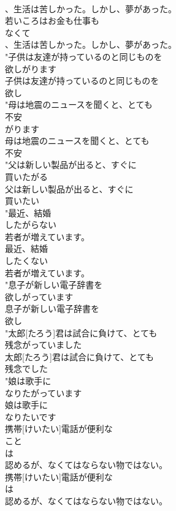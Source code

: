 \documentclass[8pt]{extreport}
\begin{document}
\begin{CJK}{UTF8}{min}
\\	、生活は苦しかった。しかし、夢があった。
\\	若いころはお金も仕事も
\\	なくて
\\	、生活は苦しかった。しかし、夢があった。
\\	"子供は友達が持っているのと同じものを
\\	欲しがります
\\	子供は友達が持っているのと同じものを
\\	欲し
\\	"母は地震のニュースを聞くと、とても
\\	不安
\\	がります
\\	母は地震のニュースを聞くと、とても
\\	不安
\\	"父は新しい製品が出ると、すぐに
\\	買いたがる
\\	父は新しい製品が出ると、すぐに
\\	買いたい
\\	"最近、結婚
\\	したがらない
\\	若者が増えています。
\\	最近、結婚
\\	したくない
\\	若者が増えています。
\\	"息子が新しい電子辞書を
\\	欲しがっています
\\	息子が新しい電子辞書を
\\	欲し
\\	"太郎[たろう]君は試合に負けて、とても
\\	残念がっていました
\\	太郎[たろう]君は試合に負けて、とても
\\	残念でした
\\	"娘は歌手に
\\	なりたがっています
\\	娘は歌手に
\\	なりたいです
\\	携帯[けいたい]電話が便利な
\\	こと
\\	は
\\	認めるが、なくてはならない物ではない。
\\	携帯[けいたい]電話が便利な
\\	は
\\	認めるが、なくてはならない物ではない。

\end{CJK}
\end{document}
